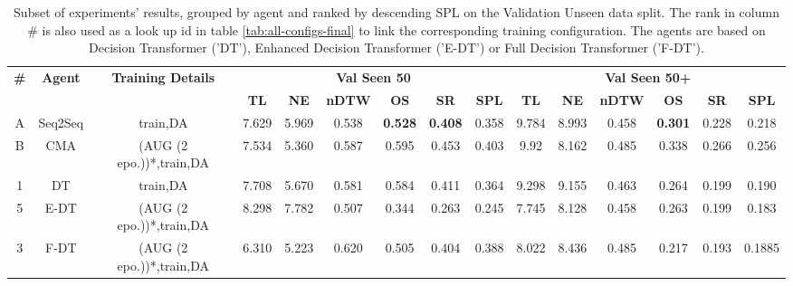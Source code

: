 \begin{table}
\centering
\caption{\label{tab:best_seen_50}Subset of experiments' results, grouped by agent and ranked by descending SPL on the Validation Unseen data split. The rank in column \# is also used as a look up id in table \ref{tab:all-configs-final} to link the corresponding training configuration.     \newline The agents are based on Decision Transformer ('DT'), Enhanced Decision Transformer ('E-DT') or Full Decision Transformer ('F-DT').}
\begin{tabular}{@{\hskip3pt}c@{\hskip3pt}c@{\hskip3pt}c@{\hskip3pt}c@{\hskip3pt}c@{\hskip3pt}c@{\hskip3pt}c@{\hskip3pt}c@{\hskip3pt}c@{\hskip3pt}c@{\hskip3pt}c@{\hskip3pt}c@{\hskip3pt}c@{\hskip3pt}c@{\hskip3pt}c}
\toprule
\textbf{\#} & \textbf{Agent} & \textbf{Training Details} & \multicolumn{6}{c}{\textbf{Val Seen 50}} & \multicolumn{6}{c}{\textbf{Val Seen 50+}} \\
 \textbf{~} &     \textbf{~} &                \textbf{~} &       \textbf{TL} &    \textbf{NE} &   \textbf{nDTW} &     \textbf{OS} &    \textbf{SR} &    \textbf{SPL} &         \textbf{TL} &     \textbf{NE} &   \textbf{nDTW} &     \textbf{OS} &    \textbf{SR} &    \textbf{SPL} \\
          A &             Seq2Seq &                  train,DA &             7.629 &          5.969 &           0.538 &  \textbf{ 0.528} &  \textbf{ 0.408} &           0.358 &                9.784 &           8.993 &           0.458 &  \textbf{0.301} &  0.228 &  0.218 \\
          B &           CMA &  (AUG (2 epo.))*,train,DA &             7.534 &          5.360 &           0.587 &           0.595 &          0.453 &           0.403 &               9.92 &           8.162 &           0.485 &           0.338 &          0.266 &           0.256 \\
\midrule
          1 &             DT &                  train,DA &             7.708&          5.670 &           0.581 &   0.584 &  0.411 &           0.364 &                9.298 &     9.155      &    0.463       &  0.264 & 0.199  &  0.190 \\
          5 &           E-DT &  (AUG (2 epo.))*,train,DA &             8.298 &          7.782 &           0.507 &           0.344 &          0.263 &           0.245 &               7.745 &           8.128 &           0.458 &           0.263 &          0.199 &           0.183 \\
          3 &           F-DT &  (AUG (2 epo.))*,train,DA &              6.310 &  5.223 &  0.620 &        0.505    &        0.404   &    0.388 &               8.022 &  8.436 &  0.485 &       0.217      &          0.193 &           0.1885 \\
\bottomrule
\end{tabular}
\end{table}
